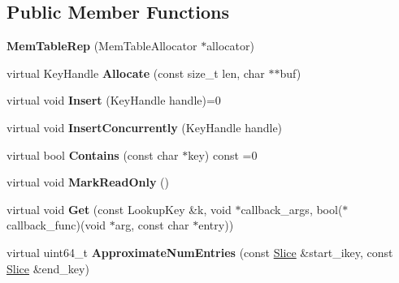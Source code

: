 \subsection*{Public Member Functions}
\begin{DoxyCompactItemize}
\item 
{\bfseries Mem\+Table\+Rep} (Mem\+Table\+Allocator $\ast$allocator)\hypertarget{classrocksdb_1_1MemTableRep_a40f57aa1059c416c706f44bd0573062b}{}\label{classrocksdb_1_1MemTableRep_a40f57aa1059c416c706f44bd0573062b}

\item 
virtual Key\+Handle {\bfseries Allocate} (const size\+\_\+t len, char $\ast$$\ast$buf)\hypertarget{classrocksdb_1_1MemTableRep_a6c355ad7a8a4163c6da861fcd2e9e1c1}{}\label{classrocksdb_1_1MemTableRep_a6c355ad7a8a4163c6da861fcd2e9e1c1}

\item 
virtual void {\bfseries Insert} (Key\+Handle handle)=0\hypertarget{classrocksdb_1_1MemTableRep_a16ea561f3ad9fa8a7817081f41a5bc6f}{}\label{classrocksdb_1_1MemTableRep_a16ea561f3ad9fa8a7817081f41a5bc6f}

\item 
virtual void {\bfseries Insert\+Concurrently} (Key\+Handle handle)\hypertarget{classrocksdb_1_1MemTableRep_a4bc4b4bc476d9aee29a381ee94256003}{}\label{classrocksdb_1_1MemTableRep_a4bc4b4bc476d9aee29a381ee94256003}

\item 
virtual bool {\bfseries Contains} (const char $\ast$key) const =0\hypertarget{classrocksdb_1_1MemTableRep_a9680af59089a57d48e65305181af275a}{}\label{classrocksdb_1_1MemTableRep_a9680af59089a57d48e65305181af275a}

\item 
virtual void {\bfseries Mark\+Read\+Only} ()\hypertarget{classrocksdb_1_1MemTableRep_a8bada15fbc6e474c3cdd25ba739b47b3}{}\label{classrocksdb_1_1MemTableRep_a8bada15fbc6e474c3cdd25ba739b47b3}

\item 
virtual void {\bfseries Get} (const Lookup\+Key \&k, void $\ast$callback\+\_\+args, bool($\ast$callback\+\_\+func)(void $\ast$arg, const char $\ast$entry))\hypertarget{classrocksdb_1_1MemTableRep_a6822dec90fff8e8048089f219529c952}{}\label{classrocksdb_1_1MemTableRep_a6822dec90fff8e8048089f219529c952}

\item 
virtual uint64\+\_\+t {\bfseries Approximate\+Num\+Entries} (const \hyperlink{classrocksdb_1_1Slice}{Slice} \&start\+\_\+ikey, const \hyperlink{classrocksdb_1_1Slice}{Slice} \&end\+\_\+key)\hypertarget{classrocksdb_1_1MemTableRep_a9ddecdf2ae912245236f170cd08e22b9}{}\label{classrocksdb_1_1MemTableRep_a9ddecdf2ae912245236f170cd08e22b9}


\end{DoxyCompactItemize}
